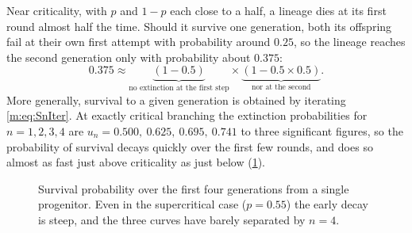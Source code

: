 Near criticality, with $p$ and $1-p$ each close to a half, a lineage dies at its
first round almost half the time. Should it survive one generation, both its
offspring fail at their own first attempt with probability around $0.25$, so the
lineage reaches the second generation only with probability about $0.375$:
\begin{equation*}
0.375\approx
\underbrace{(1-0.5)}_{\text{no extinction at the first step}}\times
\underbrace{(1-0.5\times0.5)}_{\text{nor at the second}} .
\end{equation*}
More generally, survival to a given generation is obtained by iterating
\cref{m:eq:SnIter}. At exactly critical branching the extinction probabilities for
$n=1,2,3,4$ are $u_n = 0.500,\ 0.625,\ 0.695,\ 0.741$ to three significant figures,
so the probability of survival decays quickly over the first few rounds, and does
so almost as fast just above criticality as just below (\cref{m:fig:earlySn}).

\begin{figure}[ht]
\centering
\caption{Survival probability over the first four generations from a single
progenitor. Even in the supercritical case ($p=0.55$) the early decay is steep, and
the three curves have barely separated by $n=4$.}
\label{m:fig:earlySn}
\end{figure}

